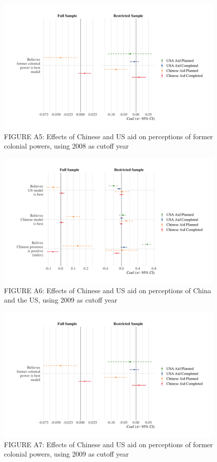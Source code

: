 \documentclass[9pt]{article}
\begin{document}
\begin{figure}[H]
\centering
\includegraphics[width=1\textwidth]{figures/figure_a5.png}
\caption{FIGURE A5: Effects of Chinese and US aid on perceptions of former colonial powers, using 2008 as cutoff year}
\end{figure}

\begin{figure}[H]
\centering
\includegraphics[width=1\textwidth]{figures/figure_a6.png}
\caption{FIGURE A6: Effects of Chinese and US aid on perceptions of China and the US, using 2009 as cutoff year}
\end{figure}

\begin{figure}[H]
\centering
\includegraphics[width=1\textwidth]{figures/figure_a7.png}
\caption{FIGURE A7: Effects of Chinese and US aid on perceptions of former colonial powers, using 2009 as cutoff year}
\end{figure}
\end{document}
